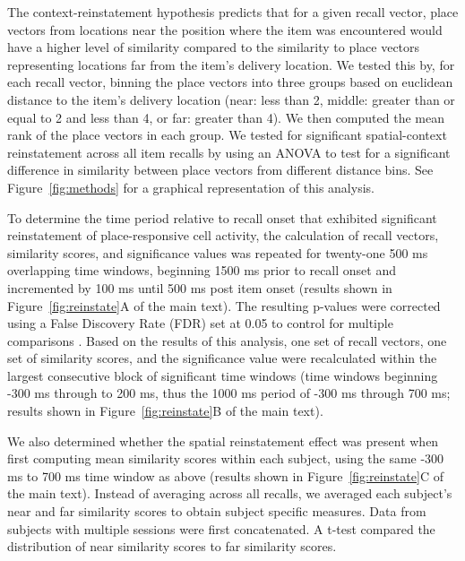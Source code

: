 The context-reinstatement hypothesis predicts that for a given recall vector, place vectors from locations near the position where the item was encountered would have a higher level of similarity compared to the similarity to place vectors representing locations far from the item's delivery location.  We tested this by, for each recall vector, binning the place vectors into three groups based on euclidean distance to the item's delivery location (near: less than 2, middle: greater than or equal to 2 and less than 4, or far: greater than 4). We then computed the mean rank of the place vectors in each group.  We tested for significant spatial-context reinstatement across all item recalls by using an ANOVA to test for a significant difference in similarity between place vectors from different distance bins. See Figure~\ref{fig:methods} for a graphical representation of this analysis.

To determine the time period relative to recall onset that exhibited significant reinstatement of place-responsive cell activity, the calculation of recall vectors, similarity scores, and significance values was repeated for twenty-one 500 ms overlapping time windows, beginning 1500 ms prior to recall onset and incremented by 100 ms until 500 ms post item onset (results shown in Figure~\ref{fig:reinstate}A of the main text).  The resulting p-values were corrected using a False Discovery Rate (FDR) set at 0.05 to control for multiple comparisons \cite{BenjHoch95}. Based on the results of this analysis, one set of recall vectors, one set of similarity scores, and the significance value were recalculated within the largest consecutive block of significant time windows (time windows beginning -300 ms through to 200 ms, thus the 1000 ms period of -300 ms through 700 ms; results shown in Figure~\ref{fig:reinstate}B of the main text).

We also determined whether the spatial reinstatement effect was present when first computing mean similarity scores within each subject, using the same -300 ms to 700 ms time window as above (results shown in Figure~\ref{fig:reinstate}C of the main text). Instead of averaging across all recalls, we averaged each subject's near and far similarity scores to obtain subject specific measures. Data from subjects with multiple sessions were first concatenated. A t-test compared the distribution of near similarity scores to far similarity scores.

